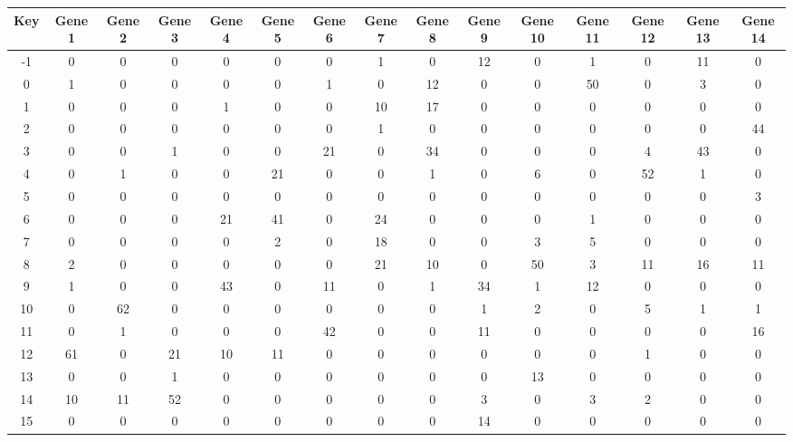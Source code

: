 \begin{tabular}{|c|c|c|c|c|c|c|c|c|c|c|c|c|c|c|}
\hline
Key & Gene 1 & Gene 2 & Gene 3 & Gene 4 & Gene 5 & Gene 6 & Gene 7 & Gene 8 & Gene 9 & Gene 10 & Gene 11 & Gene 12 & Gene 13 & Gene 14 \\
\hline
-1 & 0 & 0 & 0 & 0 & 0 & 0 & 1 & 0 & 12 & 0 & 1 & 0 & 11 & 0 \\
0 & 1 & 0 & 0 & 0 & 0 & 1 & 0 & 12 & 0 & 0 & 50 & 0 & 3 & 0 \\
1 & 0 & 0 & 0 & 1 & 0 & 0 & 10 & 17 & 0 & 0 & 0 & 0 & 0 & 0 \\
2 & 0 & 0 & 0 & 0 & 0 & 0 & 1 & 0 & 0 & 0 & 0 & 0 & 0 & 44 \\
3 & 0 & 0 & 1 & 0 & 0 & 21 & 0 & 34 & 0 & 0 & 0 & 4 & 43 & 0 \\
4 & 0 & 1 & 0 & 0 & 21 & 0 & 0 & 1 & 0 & 6 & 0 & 52 & 1 & 0 \\
5 & 0 & 0 & 0 & 0 & 0 & 0 & 0 & 0 & 0 & 0 & 0 & 0 & 0 & 3 \\
6 & 0 & 0 & 0 & 21 & 41 & 0 & 24 & 0 & 0 & 0 & 1 & 0 & 0 & 0 \\
7 & 0 & 0 & 0 & 0 & 2 & 0 & 18 & 0 & 0 & 3 & 5 & 0 & 0 & 0 \\
8 & 2 & 0 & 0 & 0 & 0 & 0 & 21 & 10 & 0 & 50 & 3 & 11 & 16 & 11 \\
9 & 1 & 0 & 0 & 43 & 0 & 11 & 0 & 1 & 34 & 1 & 12 & 0 & 0 & 0 \\
10 & 0 & 62 & 0 & 0 & 0 & 0 & 0 & 0 & 1 & 2 & 0 & 5 & 1 & 1 \\
11 & 0 & 1 & 0 & 0 & 0 & 42 & 0 & 0 & 11 & 0 & 0 & 0 & 0 & 16 \\
12 & 61 & 0 & 21 & 10 & 11 & 0 & 0 & 0 & 0 & 0 & 0 & 1 & 0 & 0 \\
13 & 0 & 0 & 1 & 0 & 0 & 0 & 0 & 0 & 0 & 13 & 0 & 0 & 0 & 0 \\
14 & 10 & 11 & 52 & 0 & 0 & 0 & 0 & 0 & 3 & 0 & 3 & 2 & 0 & 0 \\
15 & 0 & 0 & 0 & 0 & 0 & 0 & 0 & 0 & 14 & 0 & 0 & 0 & 0 & 0 \\
\hline
\end{tabular}